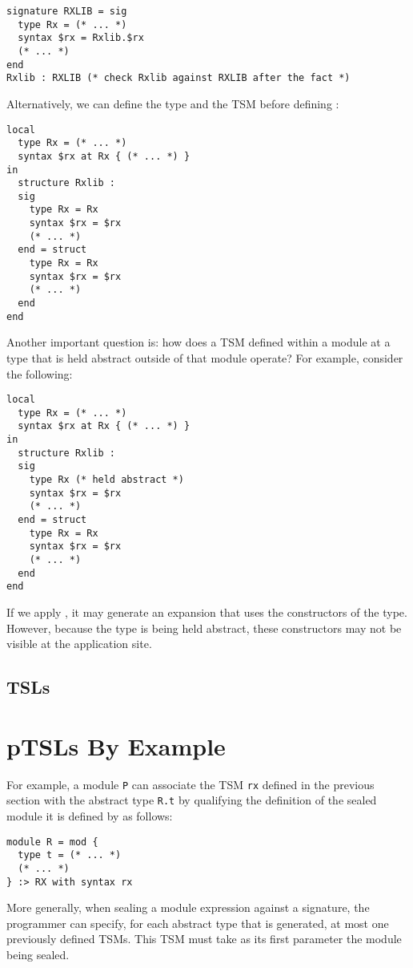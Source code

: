 \begin{lstlisting}[numbers=none]
signature RXLIB = sig 
  type Rx = (* ... *)
  syntax $rx = Rxlib.$rx
  (* ... *)
end
Rxlib : RXLIB (* check Rxlib against RXLIB after the fact *)
\end{lstlisting}

Alternatively, we can define the type  and the TSM  before defining :
\begin{lstlisting}[numbers=none]
local 
  type Rx = (* ... *)
  syntax $rx at Rx { (* ... *) }
in 
  structure Rxlib : 
  sig 
    type Rx = Rx
    syntax $rx = $rx
    (* ... *)
  end = struct 
    type Rx = Rx 
    syntax $rx = $rx
    (* ... *)
  end
end 
\end{lstlisting}

Another important question is: how does a TSM defined within a module at a type that is held abstract outside of that module operate? For example, consider the following:
\begin{lstlisting}[numbers=none]
local 
  type Rx = (* ... *)
  syntax $rx at Rx { (* ... *) }
in 
  structure Rxlib : 
  sig 
    type Rx (* held abstract *)
    syntax $rx = $rx
    (* ... *)
  end = struct 
    type Rx = Rx
    syntax $rx = $rx
    (* ... *)
  end
end 
\end{lstlisting}
If we apply , it may generate an expansion that uses the constructors of the  type. However, because the type is being held abstract, these constructors may not be visible at the application site. 

\subsection{TSLs}

\section{pTSLs By Example}
For example, a module \lstinline{P} can associate the TSM \lstinline{rx} defined in the previous section with the abstract type \lstinline{R.t} by qualifying the definition of the sealed module it is defined by as follows:
\begin{lstlisting}[numbers=none]
module R = mod {
  type t = (* ... *)
  (* ... *)
} :> RX with syntax rx
\end{lstlisting}
More generally, when sealing a module expression against a signature, the programmer can specify, for each abstract type that is generated, at most one previously defined TSMs. This TSM must take as its first parameter the module being sealed.


